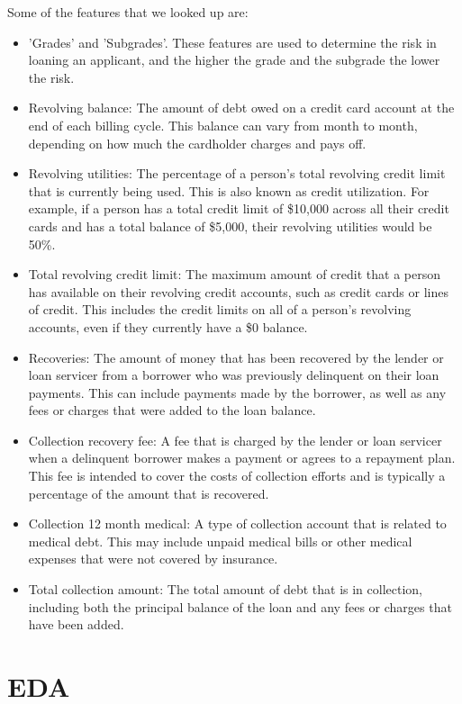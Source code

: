 \documentclass[sigplan]{acmart}
\begin{document}
Some of the features that we looked up are:
\begin{itemize}
    \item 'Grades' and  'Subgrades'. These features are used to determine the risk in loaning an applicant, and the higher the grade and the subgrade the lower the risk.
    \item Revolving balance: The amount of debt owed on a credit card account at the end of each billing cycle. This balance can vary from month to month, depending on how much the cardholder charges and pays off.
    \item Revolving utilities: The percentage of a person's total revolving credit limit that is currently being used. This is also known as credit utilization. For example, if a person has a total credit limit of \$10,000 across all their credit cards and has a total balance of \$5,000, their revolving utilities would be 50\%.
    \item Total revolving credit limit: The maximum amount of credit that a person has available on their revolving credit accounts, such as credit cards or lines of credit. This includes the credit limits on all of a person's revolving accounts, even if they currently have a \$0 balance.
    \item Recoveries: The amount of money that has been recovered by the lender or loan servicer from a borrower who was previously delinquent on their loan payments. This can include payments made by the borrower, as well as any fees or charges that were added to the loan balance.
    \item Collection recovery fee: A fee that is charged by the lender or loan servicer when a delinquent borrower makes a payment or agrees to a repayment plan. This fee is intended to cover the costs of collection efforts and is typically a percentage of the amount that is recovered.
    \item Collection 12 month medical: A type of collection account that is related to medical debt. This may include unpaid medical bills or other medical expenses that were not covered by insurance.
    \item Total collection amount: The total amount of debt that is in collection, including both the principal balance of the loan and any fees or charges that have been added.
\end{itemize}

\section{EDA}
\end{document}
